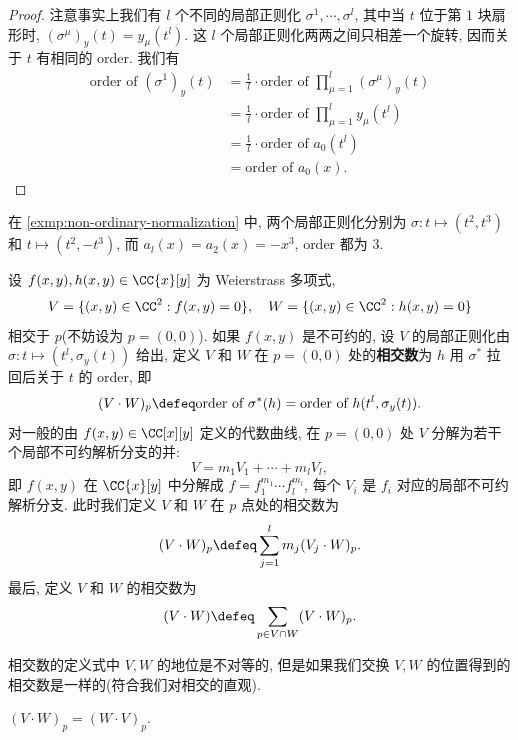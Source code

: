 \begin{proof}
注意事实上我们有 $l$ 个不同的局部正则化 $\sigma^1,\cdots, \sigma^l$,
其中当 $t$ 位于第 $1$ 块扇形时, $(\sigma^\mu)_y(t) = y_\mu(t^l)$.
这 $l$ 个局部正则化两两之间只相差一个旋转,
因而关于 $t$ 有相同的 order. 我们有
\begin{align*}
    \text{order of }(\sigma^1)_y(t) &= \frac{1}{l}\cdot \text{order of }\prod_{\mu=1}^{l}(\sigma^\mu)_y(t)\\
    &=\frac{1}{l}\cdot \text{order of }\prod_{\mu=1}^ly_\mu(t^l)\\
    &=\frac{1}{l}\cdot \text{order of }a_0(t^l)\\
    &=\text{order of }a_0(x).
\end{align*}
\end{proof}

在 \cref{exmp:non-ordinary-normalization} 中,
两个局部正则化分别为 $\sigma: t \mapsto (t^2, t^3)$ 和 $t \mapsto (t^2, -t^3)$,
而 $a_l(x) = a_2(x) = -x^3$, order 都为 $3$.

\begin{defin}[相交数]
\label{defin:intersection-number}
设 $f(x,y), h(x,y) \in \CC\{x\}[y]$ 为 Weierstrass 多项式,
\[V = \{(x,y) \in \CC^2: f(x,y) = 0\}, \quad W = \{(x,y) \in \CC^2: h(x,y) = 0\}\]
相交于 $p$(不妨设为 $p = (0,0)$).
如果 $f(x,y)$ 是不可约的,
设 $V$ 的局部正则化由 $\sigma: t \mapsto (t^l, \sigma_y(t))$ 给出,
定义 $V$ 和 $W$ 在 $p = (0,0)$ 处的\textbf{相交数}为 $h$ 用 $\sigma^*$ 拉回后关于 $t$ 的 order, 即
\[(V\cdot W)_p \defeq \text{order of }\sigma^*(h) = \text{order of }h(t^l,\sigma_y(t)).\]
对一般的由 $f(x,y) \in \CC[x][y]$ 定义的代数曲线,
在 $p = (0,0)$ 处 $V$ 分解为若干个局部不可约解析分支的并:
\[V = m_1V_1 + \cdots + m_lV_l,\]
即 $f(x,y)$ 在 $\CC\{x\}[y]$ 中分解成 $f = f_1^{m_1}\cdots f_l^{m_l}$,
每个 $V_i$ 是 $f_i$ 对应的局部不可约解析分支.
此时我们定义 $V$ 和 $W$ 在 $p$ 点处的相交数为
\[(V\cdot W)_p \defeq \sum_{j=1}^l m_j(V_j\cdot W)_p.\]
最后, 定义 $V$ 和 $W$ 的相交数为
\[(V \cdot W) \defeq \sum_{p \in V\cap W} (V\cdot W)_p.\]
\end{defin}

相交数的定义式中 $V, W$ 的地位是不对等的,
但是如果我们交换 $V, W$ 的位置得到的相交数是一样的(符合我们对相交的直观).

\begin{prop}[相交数的对称性]
$(V\cdot W)_p = (W\cdot V)_p$.
\end{prop}

